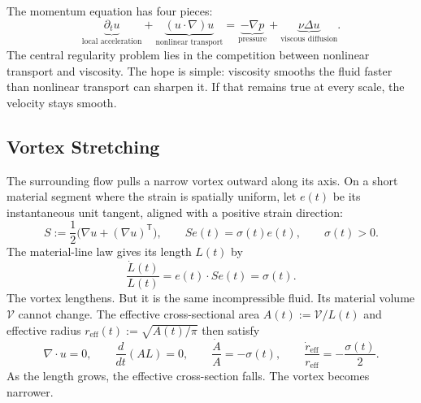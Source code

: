 
The momentum equation has four pieces:
\[
  \underbrace{\partial_t u}_{\text{local acceleration}}
  +
  \underbrace{(u\cdot\nabla)u}_{\text{nonlinear transport}}
  =
  \underbrace{-\nabla p}_{\text{pressure}}
  +
  \underbrace{\nu\Delta u}_{\text{viscous diffusion}}.
\]
The central regularity problem lies in the competition between nonlinear transport and viscosity.
The hope is simple: viscosity smooths the fluid faster than nonlinear transport can sharpen it.
If that remains true at every scale, the velocity stays smooth.

\subsection{Vortex Stretching}\label{sub:ThePerfectlyStretchingVortex}

The surrounding flow pulls a narrow vortex outward along its axis.
On a short material segment where the strain is spatially uniform, let \(e(t)\) be its instantaneous unit tangent, aligned with a positive strain direction:
\[
  S:=\frac12\bigl(\nabla u+(\nabla u)^{\mathsf T}\bigr),
  \qquad
  Se(t)=\sigma(t)e(t),
  \qquad
  \sigma(t)>0.
\]
The material-line law gives its length \(L(t)\) by
\[
  \frac{\dot L(t)}{L(t)}
  =
  e(t)\cdot Se(t)
  =
  \sigma(t).
\]
The vortex lengthens.
But it is the same incompressible fluid.
Its material volume \(\mathcal V\) cannot change.
The effective cross-sectional area \(A(t):=\mathcal V/L(t)\) and effective radius \(r_{\mathrm{eff}}(t):=\sqrt{A(t)/\pi}\) then satisfy
\[
  \nabla\cdot u=0,
  \qquad
  \frac{d}{dt}(A L)=0,
  \qquad
  \frac{\dot A}{A}=-\sigma(t),
  \qquad
  \frac{\dot r_{\mathrm{eff}}}{r_{\mathrm{eff}}}
  =
  -\frac{\sigma(t)}{2}.
\]
As the length grows, the effective cross-section falls.
The vortex becomes narrower.

